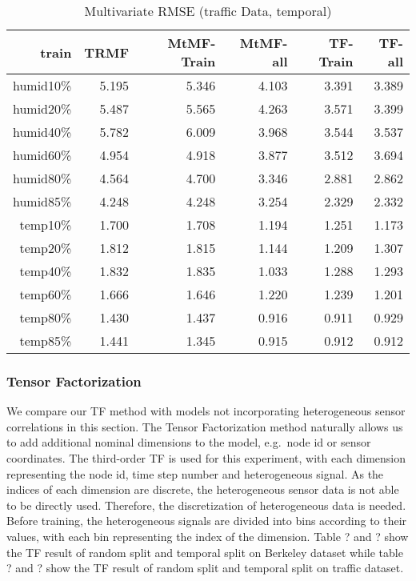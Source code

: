 \begin{table}[htbp]
\setlength{\tabcolsep}{2pt}
\centering
\caption{Multivariate RMSE (traffic Data, temporal)}
\label{table_multi_traffic_temporal}
\begin{tabular}{r | r r r r r}
train	&TRMF	&MtMF-Train	&MtMF-all &TF-Train &TF-all\\ \hline
humid10\%	&5.195 	&5.346 	&4.103&3.391&3.389\\  
humid20\%	&5.487 	&5.565 	&4.263&3.571&3.399\\
humid40\%	&5.782 	&6.009 	&3.968&3.544&3.537\\
humid60\%	&4.954 	&4.918 	&3.877&3.512&3.694\\
humid80\%	&4.564 	&4.700 	&3.346&2.881&2.862\\
humid85\%	&4.248 	&4.248 	&3.254&2.329&2.332\\ \hline
 temp10\%	&1.700 	&1.708 	&1.194&1.251&1.173\\
 temp20\%	&1.812 	&1.815 	&1.144&1.209&1.307\\
 temp40\%	&1.832 	&1.835 	&1.033&1.288&1.293\\
 temp60\%	&1.666 	&1.646 	&1.220&1.239&1.201\\
 temp80\%	&1.430 	&1.437 	&0.916&0.911&0.929\\
 temp85\%	&1.441 	&1.345 	&0.915&0.912&0.912\\
\end{tabular}
\end{table}
\subsubsection{Tensor Factorization} %
We compare our TF method with models not incorporating heterogeneous sensor correlations in this section.
The Tensor Factorization method naturally allows us to add additional nominal dimensions to the model, e.g.\ node id or sensor coordinates.
The third-order TF is used for this experiment, with each dimension representing the node id, time step number and heterogeneous signal.  
As the indices of each dimension are discrete, the heterogeneous sensor data is not able to be directly used.
Therefore, the discretization of heterogeneous data is needed.
Before training, the heterogeneous signals are divided into bins according to their values, with each bin representing the index of the dimension.
Table ? and ? show the TF result of random split and temporal split on Berkeley dataset while table ? and ? show the TF result of random split and temporal split on traffic dataset.

